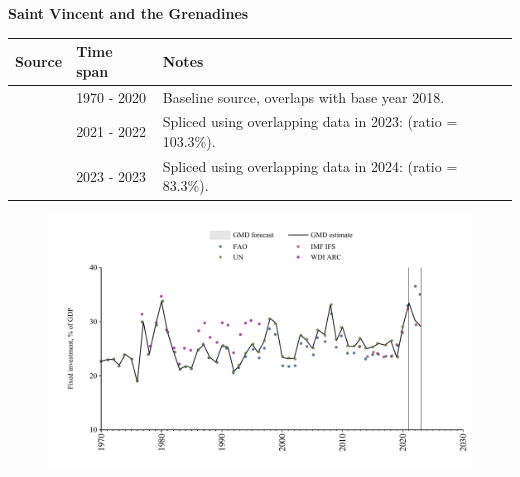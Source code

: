 \documentclass[12pt,a4paper,landscape]{article}
\begin{document}
\begin{adjustbox}{max totalsize={\paperwidth}{\paperheight},center}
\begin{minipage}[t][\textheight][t]{\textwidth}
\vspace*{0.5cm}
{}
\begin{center}
{\Large\bfseries Saint Vincent and the Grenadines}
\end{center}
\vspace{0.5cm}
\begin{table}[H]
\centering
\small
\begin{tabular}{|l|l|l|}
\hline
\textbf{Source} & \textbf{Time span} & \textbf{Notes} \\
\hline
\rowcolor{white}\cite{UN}& 1970 - 2020 &Baseline source, overlaps with base year 2018.\\
\rowcolor{lightgray}\cite{IMF_IFS}& 2021 - 2022 &Spliced using overlapping data in 2023: (ratio = 103.3\%).\\
\rowcolor{white}\cite{FAO}& 2023 - 2023 &Spliced using overlapping data in 2024: (ratio = 83.3\%).\\
\hline
\end{tabular}
\end{table}
\begin{figure}[H]
\centering
\includegraphics[width=\textwidth,height=0.6\textheight,keepaspectratio]{graphs/VCT_finv_GDP.pdf}
\end{figure}
\end{minipage}
\end{adjustbox}
\end{document}
